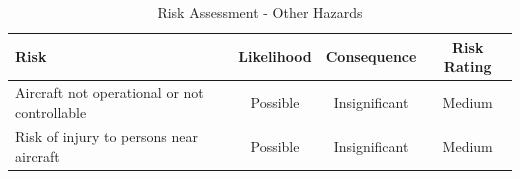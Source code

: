 \begin{table}[!h]
	\label{tab:risks-other}
	\centering
	\begin{tabularx}{\textwidth}{|Y|c|c|c|}
		\hline
		\textbf{Risk} & \textbf{Likelihood} & \textbf{Consequence} & \textbf{Risk Rating}\\
		\hline
		Aircraft not operational or not controllable & Possible & Insignificant & Medium \\
		\hline
		Risk of injury to persons near aircraft & Possible & Insignificant & Medium \\
		\hline
	\end{tabularx} 
	\caption{Risk Assessment - Other Hazards}
\end{table}